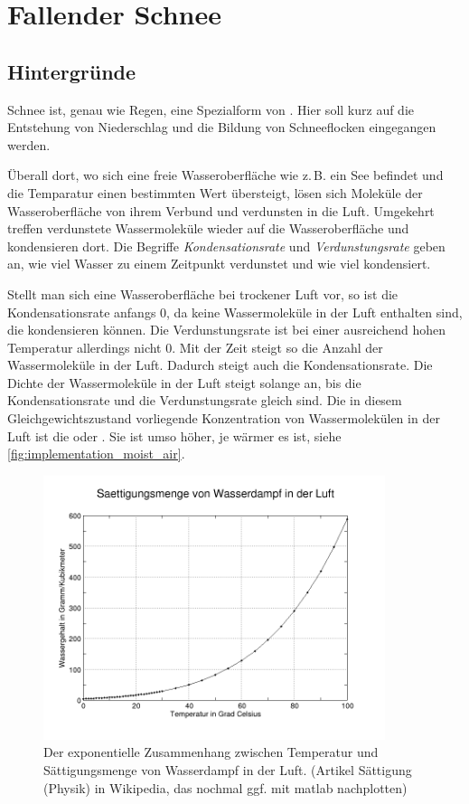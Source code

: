 \section{Fallender Schnee}

\subsection{Hintergründe}

Schnee ist, genau wie Regen, eine Spezialform von .
Hier soll kurz auf die Entstehung von Niederschlag und die Bildung von
Schneeflocken eingegangen werden\cite{wiki:Luftfeuchtigkeit}.

Überall dort, wo sich eine freie Wasseroberfläche wie z.\,B. ein See befindet und
die Temparatur einen bestimmten Wert übersteigt, lösen sich Moleküle der
Wasseroberfläche von ihrem Verbund und verdunsten in die Luft. Umgekehrt treffen
verdunstete Wassermoleküle wieder auf die Wasseroberfläche und kondensieren
dort. Die Begriffe \emph{Kondensationsrate} und
\emph{Verdunstungsrate} geben an, wie viel Wasser zu einem Zeitpunkt
verdunstet und wie viel kondensiert.

Stellt man sich eine Wasseroberfläche bei trockener Luft vor, so ist
die Kondensationsrate anfangs 0, da keine Wassermoleküle in der Luft
enthalten sind, die kondensieren können. Die Verdunstungsrate ist
bei einer ausreichend hohen Temperatur allerdings nicht 0. Mit der
Zeit steigt so die Anzahl der Wassermoleküle in der Luft. Dadurch
steigt auch die Kondensationsrate. Die Dichte der Wassermoleküle in
der Luft steigt solange an, bis die Kondensationsrate und die
Verdunstungsrate gleich sind. Die in diesem Gleichgewichtszustand
vorliegende Konzentration von Wassermolekülen in der Luft ist die
 oder . Sie ist umso höher, je wärmer es ist, siehe
\autoref{fig:implementation_moist_air}.

\begin{figure}[ht]
\centering
\includegraphics[width=10cm]{images/moist_air}
\caption{Der exponentielle Zusammenhang zwischen Temperatur und Sättigungsmenge von Wasserdampf in der Luft. (Artikel Sättigung (Physik) in Wikipedia, das nochmal ggf. mit matlab nachplotten)}
\label{fig:implementation_moist_air}
\end{figure}

